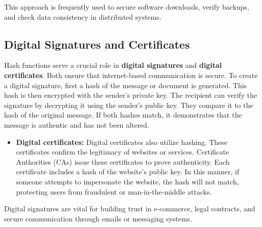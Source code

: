 \documentclass[11pt,a4paper]{article}
\begin{document}
        This approach is frequently used to secure software downloads, verify backups, and check data consistency in distributed systems.

    \subsection*{Digital Signatures and Certificates}
    Hash functions serve a crucial role in \textbf{digital signatures} and \textbf{digital certificates}. Both ensure that internet-based communication is secure. To create a digital signature, first a hash of the message or document is generated. This hash is then encrypted with the sender's private key. The recipient can verify the signature by decrypting it using the sender's public key. They compare it to the hash of the original message. If both hashes match, it demonstrates that the message is authentic and has not been altered.
        \begin{itemize}
            \item \textbf{Digital certificates:} Digital certificates also utilize hashing. These certificates confirm the legitimacy of websites or services. Certificate Authorities (CAs) issue these certificates to prove authenticity. Each certificate includes a hash of the website's public key. In this manner, if someone attempts to impersonate the website, the hash will not match, protecting users from fraudulent or man-in-the-middle attacks.
        \end{itemize}
        Digital signatures are vital for building trust in e-commerce, legal contracts, and secure communication through emails or messaging systems.
\end{document}
